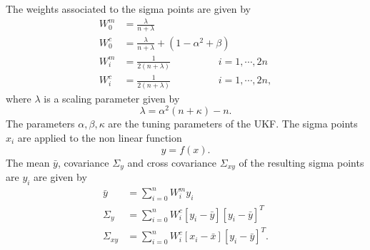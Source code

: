 The weights associated to the sigma points are given by 
\begin{equation}
    \label{eq:ut_weights}
    \begin{split}
    W_0^m &= \frac{\lambda}{n+\lambda} \\
    W_0^c &= \frac{\lambda}{n+\lambda} + ( 1 - \alpha^2 + \beta)\\
    W_i^m &= \frac{1}{2(n+\lambda)} \hspace{2cm} i = 1, \cdots, 2n \\
    W_i^c &= \frac{1}{2(n+\lambda)} \hspace{2cm} i = 1, \cdots, 2n ,
    \end{split}
\end{equation} 
where $\lambda$ is a scaling parameter given by $$ \lambda = \alpha^2(n+\kappa)-n. $$ The parameters $\alpha,\beta,\kappa$ are the tuning parameters of the UKF.
The sigma points $x_i$ are applied to the non linear function $$y= f(x).$$ The mean $\bar y$, covariance $\Sigma_y$ and cross covariance $\Sigma_{xy}$ of the resulting sigma points are $y_i$ are given by
\begin{equation}
    \label{eq:ut_mean_cov}
    \begin{split}
        \bar y &= \sum \limits_{i=0}^n W_i^m y_i \\
        \Sigma_y &= \sum \limits_{i=0}^n W_i^c [y_i - \bar y ] [ y_i - \bar y] ^T \\
        \Sigma_{xy} &= \sum \limits_{i=0}^n W_i^c [x_i - \bar x ] [ y_i - \bar y] ^T .
    \end{split}
\end{equation}

